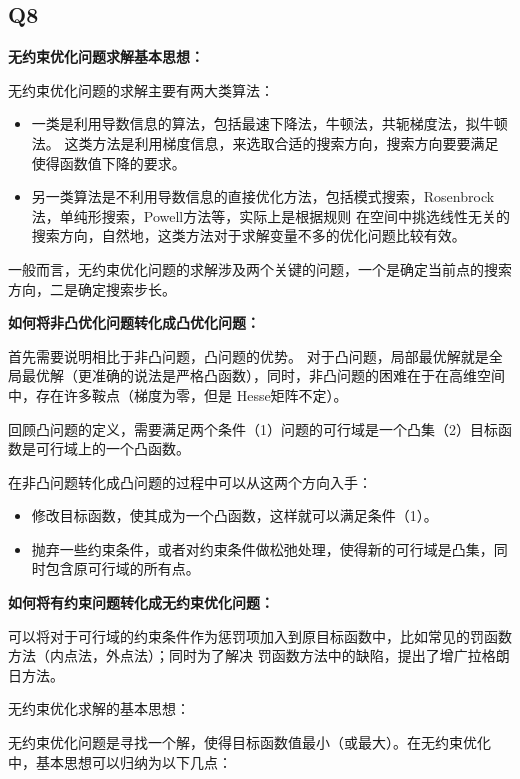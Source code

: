\documentclass{article}
\begin{document}
    \subsection*{Q8}
    \textbf{无约束优化问题求解基本思想：}

    无约束优化问题的求解主要有两大类算法：
    \begin{itemize}
        \item  一类是利用导数信息的算法，包括最速下降法，牛顿法，共轭梯度法，拟牛顿法。
    这类方法是利用梯度信息，来选取合适的搜索方向，搜索方向要要满足使得函数值下降的要求。
        \item  另一类算法是不利用导数信息的直接优化方法，包括模式搜索，Rosenbrock法，单纯形搜索，Powell方法等，实际上是根据规则
    在空间中挑选线性无关的搜索方向，自然地，这类方法对于求解变量不多的优化问题比较有效。
    \end{itemize}
    
    一般而言，无约束优化问题的求解涉及两个关键的问题，一个是确定当前点的搜索方向，二是确定搜索步长。


    \textbf{如何将非凸优化问题转化成凸优化问题：}

    首先需要说明相比于非凸问题，凸问题的优势。
    对于凸问题，局部最优解就是全局最优解（更准确的说法是严格凸函数），同时，非凸问题的困难在于在高维空间中，存在许多鞍点（梯度为零，但是
    Hesse矩阵不定）。

    回顾凸问题的定义，需要满足两个条件（1）问题的可行域是一个凸集（2）目标函数是可行域上的一个凸函数。

    在非凸问题转化成凸问题的过程中可以从这两个方向入手：
    \begin{itemize}
        \item 修改目标函数，使其成为一个凸函数，这样就可以满足条件（1）。
        \item 抛弃一些约束条件，或者对约束条件做松弛处理，使得新的可行域是凸集，同时包含原可行域的所有点。
    \end{itemize}




    

\textbf{如何将有约束问题转化成无约束优化问题：}

    可以将对于可行域的约束条件作为惩罚项加入到原目标函数中，比如常见的罚函数方法（内点法，外点法）；同时为了解决
    罚函数方法中的缺陷，提出了增广拉格朗日方法。

    无约束优化求解的基本思想：

无约束优化问题是寻找一个解，使得目标函数值最小（或最大）。在无约束优化中，基本思想可以归纳为以下几点：
\end{document}
